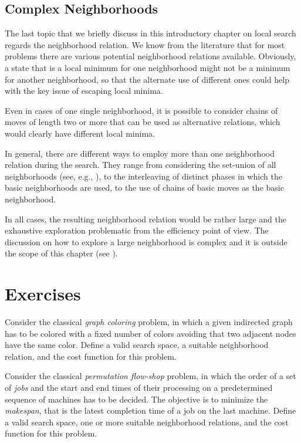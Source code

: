 \subsection{Complex Neighborhoods}

The last topic that we briefly discuss in this introductory chapter on local search regards the neighborhood relation. We know from the literature that for most problems there are various potential neighborhood relations available. Obviously, a state that is a local minimum for one neighborhood might not be a minimum for another neighborhood, so that the alternate use of different ones could help with the key issue of escaping local minima.

Even in cases of one single neighborhood, it is possible to consider chains of moves of length two or more that can be used as alternative relations, which would clearly have different local minima. 

In general, there are different ways to employ more than one neighborhood relation during the search. They range from considering the set-union of all neighborhoods (see, e.g., \cite{BCDS21}), to the interleaving of distinct phases in which the basic neighborhoods are used, to the use of chains of basic moves as the basic neighborhood. 

In all cases, the resulting neighborhood relation would be rather large and the exhaustive exploration problematic from the efficiency point of view. The discussion on how to explore a large neighborhood is complex and it is outside the scope of this chapter (see \cite{AEOP02}). 

\section{Exercises}

\begin{exercise}
Consider the classical \emph{graph coloring} problem, in which a given indirected graph has to be colored with a fixed number of colors avoiding that two adjacent nodes have the same color. Define a valid search space, a suitable neighborhood relation, and the cost function for this problem. 
\end{exercise}

\begin{exercise}\label{exe:flow-shop}
Consider the classical \emph{permutation flow-shop} problem, in which the order of a set of \emph{jobs} and the start and end times of their processing on a predetermined sequence of machines has to be decided. The objective is to minimize the \emph{makespan}, that is the latest completion time of a job on the last machine. Define a valid search space, one or more suitable neighborhood relations, and the cost function for this problem. 
\end{exercise}

